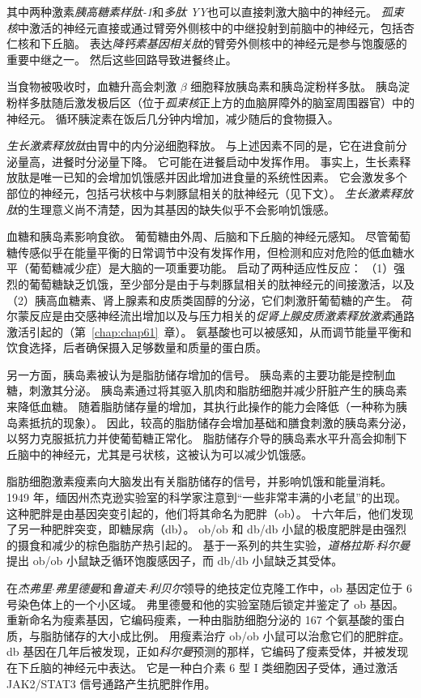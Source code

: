 其中两种激素\textit{胰高糖素样肽-1}和\textit{多肽 YY}也可以直接刺激大脑中的神经元。
\textit{孤束核}中激活的神经元直接或通过臂旁外侧核中的中继投射到前脑中的神经元，包括杏仁核和下丘脑。
表达\textit{降钙素基因相关肽}的臂旁外侧核中的神经元是参与饱腹感的重要中继之一。
然后这些回路导致进餐终止。


当食物被吸收时，血糖升高会刺激 $ \beta $ 细胞释放胰岛素和胰岛淀粉样多肽。
胰岛淀粉样多肽随后激发极后区（位于\textit{孤束核}正上方的血脑屏障外的脑室周围器官）中的神经元。
循环胰淀素在饭后几分钟内增加，减少随后的食物摄入。


\textit{生长激素释放肽}由胃中的内分泌细胞释放。
与上述因素不同的是，它在进食前分泌量高，进餐时分泌量下降。
它可能在进餐启动中发挥作用。
事实上，生长素释放肽是唯一已知的会增加饥饿感并因此增加进食量的系统性因素。
它会激发多个部位的神经元，包括弓状核中与刺豚鼠相关的肽神经元（见下文）。
\textit{生长激素释放肽}的生理意义尚不清楚，因为其基因的缺失似乎不会影响饥饿感。


血糖和胰岛素影响食欲。
葡萄糖由外周、后脑和下丘脑的神经元感知。
尽管葡萄糖传感似乎在能量平衡的日常调节中没有发挥作用，但检测和应对危险的低血糖水平（葡萄糖减少症）是大脑的一项重要功能。
启动了两种适应性反应：
（1）强烈的葡萄糖缺乏饥饿，至少部分是由于与刺豚鼠相关的肽神经元的间接激活，以及（2）胰高血糖素、肾上腺素和皮质类固醇的分泌，它们刺激肝葡萄糖的产生。
荷尔蒙反应是由交感神经流出增加以及与压力相关的\textit{促肾上腺皮质激素释放激素}通路激活引起的（第~\ref{chap:chap61}~章）。
氨基酸也可以被感知，从而调节能量平衡和饮食选择，后者确保摄入足够数量和质量的蛋白质。


另一方面，胰岛素被认为是脂肪储存增加的信号。
胰岛素的主要功能是控制血糖，刺激其分泌。
胰岛素通过将其驱入肌肉和脂肪细胞并减少肝脏产生的胰岛素来降低血糖。
随着脂肪储存量的增加，其执行此操作的能力会降低（一种称为胰岛素抵抗的现象）。
因此，较高的脂肪储存会增加基础和膳食刺激的胰岛素分泌，以努力克服抵抗力并使葡萄糖正常化。
脂肪储存介导的胰岛素水平升高会抑制下丘脑中的神经元，尤其是弓状核，这被认为可以减少饥饿感。


脂肪细胞激素瘦素向大脑发出有关脂肪储存的信号，并影响饥饿和能量消耗。
1949 年，缅因州杰克逊实验室的科学家注意到“一些非常丰满的小老鼠”的出现。
这种肥胖是由基因突变引起的，他们将其命名为肥胖（ob）。
十六年后，他们发现了另一种肥胖突变，即糖尿病（db）。
ob/ob 和 db/db 小鼠的极度肥胖是由强烈的摄食和减少的棕色脂肪产热引起的。
基于一系列的共生实验，\textit{道格拉斯$\cdot$科尔曼}提出 ob/ob 小鼠缺乏循环饱腹感因子，而 db/db 小鼠缺乏其受体。


在\textit{杰弗里$\cdot$弗里德曼}和\textit{鲁道夫$\cdot$利贝尔}领导的绝技定位克隆工作中，ob 基因定位于 6 号染色体上的一个小区域。
弗里德曼和他的实验室随后锁定并鉴定了 ob 基因。
重新命名为瘦素基因，它编码瘦素，一种由脂肪细胞分泌的 167 个氨基酸的蛋白质，与脂肪储存的大小成比例。
用瘦素治疗 ob/ob 小鼠可以治愈它们的肥胖症。
db 基因在几年后被发现，正如\textit{科尔曼}预测的那样，它编码了瘦素受体，并被发现在下丘脑的神经元中表达。
它是一种白介素 6 型 I 类细胞因子受体，通过激活 JAK2/STAT3 信号通路产生抗肥胖作用。


